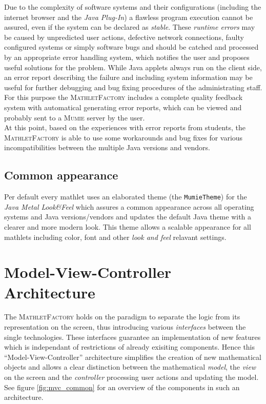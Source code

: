 \documentclass[a4paper,12pt]{article}
\newcommand{\name}[1]{\textsc{#1}}
\newcommand{\codename}[1]{\texttt{\small #1}}
\newcommand{\mf}{\name{MathletFactory }}
\newcommand{\mumie}{\name{Mumie }}
\begin{document}
Due to the complexity of software systems and their configurations (including the internet browser and the 
\textit{Java Plug-In}) a flawless program execution cannot be assured, even if the system can be
declared as \textit{stable}. These \textit{runtime errors} may be caused by unpredicted user actions,
defective network connections, faulty configured systems or simply software bugs and should be catched
and processed by an appropriate error handling system, which notifies the user and proposes useful solutions
for the problem. While Java applets always run on the client side, an error report describing the failure
and including system information may be useful for further debugging and bug fixing procedures of the
administrating staff.\\
For this purpose the \mf includes a complete quality feedback system with automatical generating
error reports, which can be viewed and probably sent to a \mumie server by the user.\\
At this point, based on the experiences with error reports from students, the \mf is able to use some 
workarounds and bug fixes for various incompatibilities between the multiple Java versions and vendors.

\subsection{Common appearance}

Per default every mathlet uses an elaborated theme (the \codename{MumieTheme}) for the 
\textit{Java Metal Look\&Feel} which assures a common appearance across all operating systems and Java
versions/vendors and updates the default Java theme with a clearer and more modern look.
This theme allows a scalable appearance for all mathlets including color, font and other \textit{look and feel} 
relavant settings.


\newpage

\section{Model-View-Controller Architecture}

The \mf holds on the paradigm to separate the logic from its representation on the screen, thus
introducing various \textit{interfaces} between the single technologies. These interfaces guarantee an 
implementation of new features which is independant of restrictions of already exisiting components.
Hence this ``Model-View-Controller'' architecture simplifies the creation of new mathematical objects and
allows a clear distinction between the mathematical \textit{model}, the \textit{view} on the screen and 
the \textit{controller} processing user actions and updating the model.\\
See figure \ref{fig:mvc_common} for an overview of the components in such an architecture.
\end{document}
